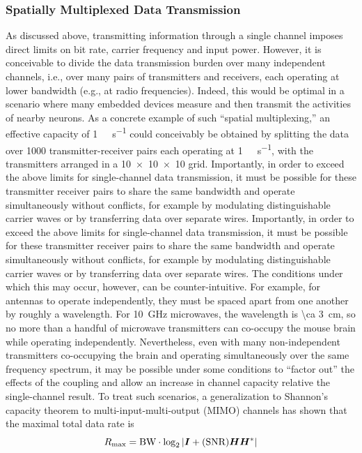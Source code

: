\subsubsection{Spatially Multiplexed Data Transmission}

As discussed above, transmitting information through a single channel imposes direct limits on bit rate, carrier frequency and input power.
However, it is conceivable to divide the data transmission burden over many independent channels, i.e., over many pairs of transmitters and receivers, each operating at lower bandwidth (e.g., at radio frequencies).
Indeed, this would be optimal in a scenario where many embedded devices measure and then transmit the activities of nearby neurons.
As a concrete example of such ``spatial multiplexing,'' an effective capacity of \SI{1}{\tera\bit\per\second} could conceivably be obtained by splitting the data over \num{1000} transmitter-receiver pairs each operating at \SI{1}{\giga\bit\per\second}, with the transmitters arranged in a \num{10 x 10 x 10} grid.
Importantly, in order to exceed the above limits for single-channel data transmission, it must be possible for these transmitter receiver pairs to share the same bandwidth and operate simultaneously without conflicts, for example by modulating distinguishable carrier waves or by transferring data over separate wires.
Importantly, in order to exceed the above limits for single-channel data transmission, it must be possible for these transmitter receiver pairs to share the same bandwidth and operate simultaneously without conflicts, for example by modulating distinguishable carrier waves or by transferring data over separate wires.
The conditions under which this may occur, however, can be counter-intuitive.
For example, for antennas to operate independently, they must be spaced apart from one another by roughly a wavelength.
For \SI{10}{\giga\hertz} microwaves, the wavelength is \SI{\ca 3}{\centi\meter}, so no more than a handful of microwave transmitters can co-occupy the mouse brain while operating independently.
Nevertheless, even with many non-independent transmitters co-occupying the brain and operating simultaneously over the same frequency spectrum, it may be possible under some conditions to ``factor out'' the effects of the coupling and allow an increase in channel capacity relative the single-channel result.
To treat such scenarios, a generalization to Shannon's capacity theorem to multi-input-multi-output (MIMO) channels has shown that the maximal total data rate is
\[R\sub{max} = \BW \cdot \log_2\left| \mat{I} + ( \SNR ) \mat{H}\mat{H}^* \right|\]
